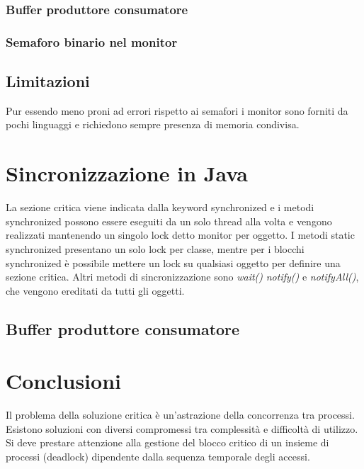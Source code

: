 \subsubsection{Buffer produttore consumatore}
\begin{multicols}{2}
	
	\columnbreak
	
\end{multicols}

\subsubsection{Semaforo binario nel monitor}

\subsection{Limitazioni}
Pur essendo meno proni ad errori rispetto ai semafori i monitor sono forniti da pochi linguaggi e richiedono sempre presenza di memoria condivisa. 
\section{Sincronizzazione in Java}
La sezione critica viene indicata dalla keyword synchronized e i metodi synchronized possono essere eseguiti da un solo thread alla volta e vengono realizzati mantenendo un singolo lock
detto monitor per oggetto. I metodi static synchronized presentano un solo lock per classe, mentre per i blocchi synchronized \`e possibile mettere un lock su qualsiasi oggetto per 
definire una sezione critica. Altri metodi di sincronizzazione sono \emph{wait()} \emph{notify()} e \emph{notifyAll()}, che vengono ereditati da tutti gli oggetti. 
\subsection{Buffer produttore consumatore}
\begin{multicols}{2}
	
	\columnbreak
	
	
\end{multicols}
\section{Conclusioni}
Il problema della soluzione critica \`e un'astrazione della concorrenza tra processi. Esistono soluzioni con diversi compromessi tra complessit\`a e difficolt\`a di utilizzo. Si 
deve prestare attenzione alla gestione del blocco critico di un insieme di processi (deadlock) dipendente dalla sequenza temporale degli accessi.
